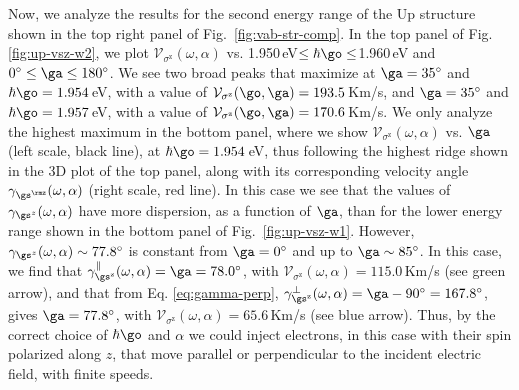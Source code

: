\documentclass[prb,11pt,tightenlines,twocolumn,aps]{revtex4-1}
\begin{document}
Now, we analyze the results for the second energy range of the Up structure
shown in the top right panel of Fig.~\ref{fig:vab-str-comp}. In the top panel
of Fig. \ref{fig:up-vsz-w2}, we plot $\mathcal{V}_{\sigma^{\mathrm{z}}}
(\omega,\alpha)$ vs. 1.950\,eV$\leq\hbar\go\leq$1.960\,eV and
$0^\circ\leq\ga\leq 180^\circ$.
% 
We see two broad peaks that maximize at $\ga=35^{\circ}$ and $\hbar\go=
1.954$\,eV, with a value of $\mathcal{V}_{\sigma^{\mathrm{z}}}(\go,\ga) =
193.5$\,Km/s, and $\ga=35^{\circ}$ and $\hbar\go= 1.957$\,eV, with a value
of $\mathcal{V}_{\sigma^{\mathrm{z}}}(\go,\ga) = 170.6$\,Km/s. 
% 
We only analyze the highest  maximum in the bottom panel, where we  show
$\mathcal{V}_{\sigma^{\mathrm{z}}} (\omega,\alpha)$ vs. $\ga$ (left scale,
black line), at $\hbar\go= 1.954$\,eV, thus following the highest ridge shown
in the 3D plot of the top panel, {\color{red}along with its corresponding
velocity angle $\gamma_{\gs^\rmz}(\omega,\alpha)$ (right scale, red line)}. In
this case we see that the values of $\gamma_{\gs^z}(\omega,\alpha)$ have more
dispersion, as a function of $\ga$, than for the lower energy range shown in
the bottom panel of Fig.~\ref{fig:up-vsz-w1}.
% 
However, $\gamma_{\gs^z}(\omega,\alpha)\sim 77.8^\circ$ is constant from
$\ga=0^\circ$ and up to $\ga\sim 85^\circ$. In this case, we find that
$\gamma^\parallel_{\gs^\mathrm{z}}(\omega,\alpha)=\ga=78.0^\circ$, with
$\mathcal{V}_{\sigma^{\mathrm{z}}}(\omega,\alpha) = 115.0$\,Km/s (see green
arrow), and that from Eq. \eqref{eq:gamma-perp},
$\gamma^\perp_{\gs^\mathrm{z}}(\omega,\alpha)=\ga-90^\circ=167.8^\circ$, gives
$\ga=77.8^\circ$, with $\mathcal{V}_{\sigma^{\mathrm{z}}}(\omega,\alpha) =
65.6$\,Km/s (see blue arrow). 
% 
Thus, by the correct choice of $\hbar\go$ and $\alpha$ we could inject
electrons, in this case with their spin polarized along $z$, that move parallel
or perpendicular to the incident electric field, with finite speeds.

\end{document}
